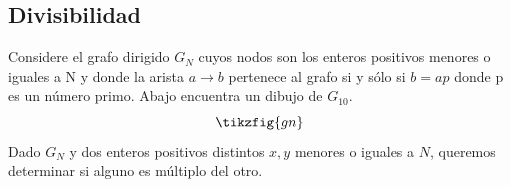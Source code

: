 \subsection{Divisibilidad}
Considere el grafo dirigido $G_N$ cuyos nodos son los enteros positivos menores o
iguales a N y donde la arista $a \to b$ pertenece al grafo si y sólo si
$b = ap$
donde p es un número primo. Abajo encuentra un dibujo de $G_{10}$.
\[
	\tikzfig{gn}
\]
Dado $G_N$ y dos enteros positivos distintos $x,y$ menores o iguales a $N$, queremos
determinar si alguno es múltiplo del otro. 

